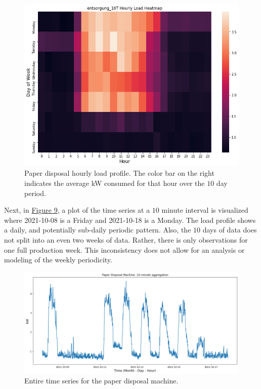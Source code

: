 \begin{figure}[h]
\centering
\graphicspath{ {./images/} }
\includegraphics[scale=0.55]{images/entsorgung_hourly_heatmap.png}
\caption{Paper disposal hourly load profile. The color bar on the right indicates the average kW consumed for that hour over the $10$ day period.}
\end{figure}

Next, in \hyperlink{figure.9}{Figure 9}, a plot of the time series at a $10$ minute interval is visualized where 2021-10-08 is a Friday and 2021-10-18 is a Monday. The load profile shows a daily, and potentially sub-daily periodic pattern. Also, the $10$ days of data does not split into an even two weeks of data. Rather, there is only observations for one full production week. This inconsistency does not allow for an analysis or modeling of the weekly periodicity. 

\begin{figure}[h]
\centering
\graphicspath{ {./images/} }
\includegraphics[scale=0.49]{images/entsorgung_10T_series.png}
\caption{Entire time series for the paper disposal machine.}
\end{figure}

